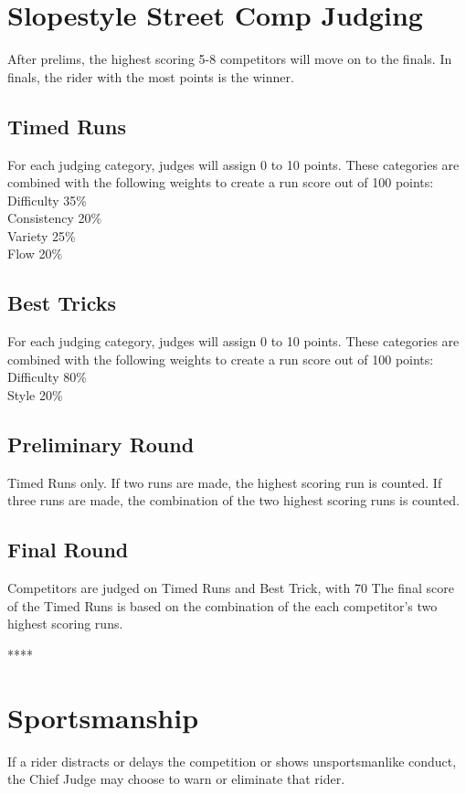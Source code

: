 \section{Slopestyle Street Comp Judging}
After prelims, the highest scoring 5-8 competitors will move on to the finals.
In finals, the rider with the most points is the winner.

\subsection{Timed Runs}
For each judging category, judges will assign 0 to 10 points. These categories are combined with the following weights to create a run score out of 100 points:\\
Difficulty 35\% \\
Consistency 20\% \\
Variety 25\% \\
Flow 20\% \\

\subsection{Best Tricks}
For each judging category, judges will assign 0 to 10 points. These categories are combined with the following weights to create a run score out of 100 points:\\
Difficulty 80\% \\
Style 20\% \\

\subsection{Preliminary Round}
Timed Runs only.
If two runs are made, the highest scoring run is counted.
If three runs are made, the combination of the two highest scoring runs is counted.

\subsection{Final Round}
Competitors are judged on Timed Runs and Best Trick, with 70%
The final score of the Timed Runs is based on the combination of the each competitor's two highest scoring runs.

****
\section{Sportsmanship}
If a rider distracts or delays the competition or shows unsportsmanlike conduct, the Chief Judge may choose to warn or eliminate that rider.
